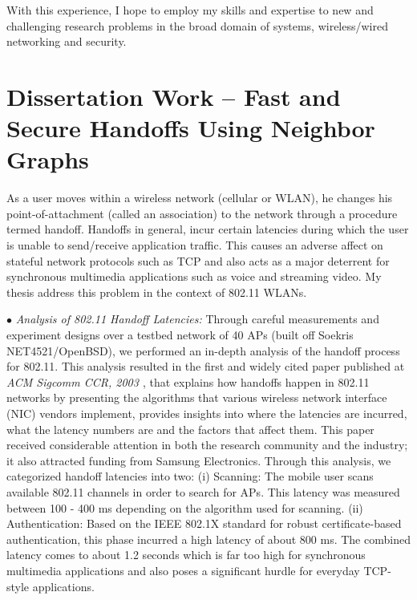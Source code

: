 \documentclass[11pt,letterpaper]{article}
\begin{document}
With this experience, I hope to employ my skills and expertise to new and challenging research problems in the broad
domain of systems, wireless/wired networking and security.

\section{Dissertation Work -- Fast and Secure Handoffs Using Neighbor Graphs}
As a user moves within a wireless
network (cellular or WLAN), he changes his point-of-attachment (called an association) to the network through a
procedure termed handoff. Handoffs in general, incur certain latencies during which the user is unable to send/receive
application traffic. This causes an adverse affect on stateful network protocols such as TCP and also acts as a major
deterrent for synchronous multimedia applications such as voice and streaming video. My thesis address this problem in
the context of 802.11 WLANs.  


$\bullet$ {\it Analysis of 802.11 Handoff Latencies:} Through careful measurements and experiment designs over
a testbed network  of 40 APs (built off Soekris NET4521/OpenBSD), we performed an in-depth analysis of the handoff
process for 802.11. This analysis resulted in the first and  widely cited paper published at {\it ACM Sigcomm CCR,
2003 \cite{ccr-handoff}}, that explains how handoffs happen in 802.11 networks by presenting the algorithms that various wireless network
interface (NIC) vendors implement, provides insights into where the latencies are incurred, what the latency numbers are
and the factors that affect them. This paper received considerable attention in both the research community and the
industry; it also attracted funding from Samsung Electronics.
Through this analysis, we categorized handoff latencies into two: (i) Scanning: The mobile user scans available 802.11
channels in order to search for APs. This latency was measured between 100 - 400 ms depending on the algorithm
used for scanning. (ii) Authentication: Based on the IEEE 802.1X standard for robust certificate-based authentication,
this phase incurred a high latency of about 800 ms. The combined latency comes to about 1.2 seconds which is far
too high for synchronous multimedia applications and also poses a significant hurdle for everyday TCP-style
applications. 
\end{document}

